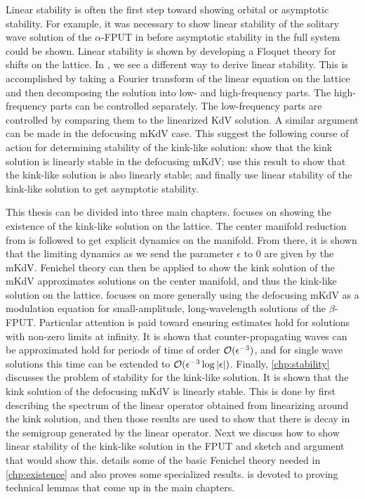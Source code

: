 Linear stability is often the first step toward showing orbital or asymptotic stability. For example, it was necessary to show linear stability of the solitary wave solution of the \(\alpha\)-FPUT in \cite{friesecke2003solitary,friesecke2004solitary} before asymptotic stability in the full system could be shown. Linear stability is shown by developing a Floquet theory for shifts on the lattice. In \cite{mizumachi2013asymptotic}, we see a different way to derive linear stability. This is accomplished by taking a Fourier transform of the linear equation on the lattice and then decomposing the solution into low- and high-frequency parts. The high-frequency parts can be controlled separately. The low-frequency parts are controlled by comparing them to the linearized KdV solution. A similar argument can be made in the defocusing mKdV case. This suggest the following course of action for determining stability of the kink-like solution: show that the kink solution is linearly stable in the defocusing mKdV; use this result to show that the kink-like solution is also linearly stable; and finally use linear stability of the kink-like solution to get asymptotic stability.

This thesis can be divided into three main chapters.  focuses on showing the existence of the kink-like solution on the lattice. The center manifold reduction from \cite{iooss2000travelling} is followed to get explicit dynamics on the manifold. From there, it is shown that the limiting dynamics as we send the parameter \(\epsilon\) to \(0\) are given by the mKdV. Fenichel theory can then be applied to show the kink solution of the mKdV approximates solutions on the center manifold, and thus the kink-like solution on the lattice.  focuses on more generally using the defocusing  mKdV as a modulation equation for small-amplitude, long-wavelength solutions of the \(\beta\)-FPUT. Particular attention is paid toward ensuring estimates hold for solutions with non-zero limits at infinity. It is shown that counter-propagating waves can be approximated hold for periods of time of order \(\mathcal{O}(\epsilon^{-3})\), and for single wave solutions this time can be extended to \(\mathcal{O}(\epsilon^{-3} \log|\epsilon|)\). Finally, \cref{chp:stability} discusses the problem of stability for the kink-like solution. It is shown that the kink solution of the defocusing mKdV is linearly stable. This is done by first describing the spectrum of the linear operator obtained from linearizing around the kink solution, and then those results are used to show that there is decay in the semigroup generated by the linear operator. Next we discuss how to show linear stability of the kink-like solution in the FPUT and sketch and argument that would show this.  details some of the basic Fenichel theory needed in \cref{chp:existence} and also proves some specialized results.  is devoted to proving technical lemmas that come up in the main chapters.